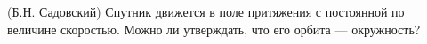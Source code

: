 (Б.Н. Садовский)
Спутник движется в поле притяжения с постоянной по величине скоростью.
Можно ли утверждать, что его орбита --- окружность?
